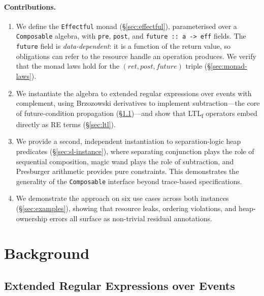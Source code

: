 \documentclass[acmsmall,screen]{acmart}
\newcommand{\post}{\mathit{post}}
\newcommand{\fut}{\mathit{future}}
\newcommand{\ret}{\mathit{ret}}
\begin{document}
\paragraph{Contributions.}
\begin{enumerate}
  \item We define the \lstinline{Effectful} monad (\S\ref{sec:effectful}),
        parameterised over a \lstinline{Composable} algebra, with
        \lstinline{pre}, \lstinline{post}, and \lstinline{future :: a -> eff}
        fields.  The \lstinline{future} field is \emph{data-dependent}: it is
        a function of the return value, so obligations can refer to the
        resource handle an operation produces.  We verify that the monad laws
        hold for the $(\ret, \post, \fut)$ triple (\S\ref{sec:monad-laws}).
  \item We instantiate the algebra to extended regular expressions over
        events with complement, using Brzozowski derivatives to implement
        subtraction---the core of future-condition propagation
        (\S\ref{sec:re})---and show that LTL\textsubscript{f} operators
        embed directly as RE terms (\S\ref{sec:ltl}).
  \item We provide a second, independent instantiation to separation-logic
        heap predicates (\S\ref{sec:sl-instance}), where separating
        conjunction plays the role of sequential composition, magic wand
        plays the role of subtraction, and Presburger arithmetic provides
        pure constraints. This demonstrates the generality of the
        \lstinline{Composable} interface beyond trace-based specifications.
  \item We demonstrate the approach on six use cases across both instances
        (\S\ref{sec:examples}), showing that resource leaks, ordering
        violations, and heap-ownership errors all surface as non-trivial
        residual annotations.
\end{enumerate}

\section{Background}
\label{sec:background}

\subsection{Extended Regular Expressions over Events}
\label{sec:re}
\end{document}
